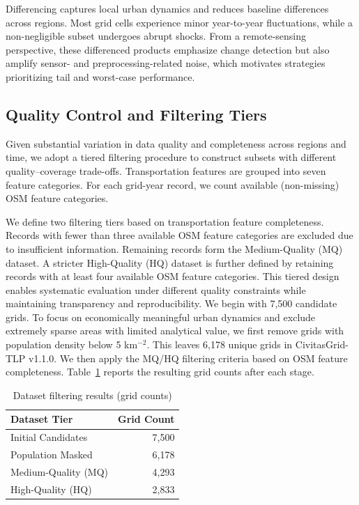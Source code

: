 \documentclass[preprint,12pt]{elsarticle}
\begin{document}
Differencing captures local urban dynamics and reduces baseline differences across regions. Most grid cells experience minor year-to-year fluctuations, while a non-negligible subset undergoes abrupt shocks. From a remote-sensing perspective, these differenced products emphasize change detection but also amplify sensor- and preprocessing-related noise, which motivates strategies prioritizing tail and worst-case performance.

\subsection{Quality Control and Filtering Tiers}

Given substantial variation in data quality and completeness across regions and time, we adopt a tiered filtering procedure to construct subsets with different quality–coverage trade-offs. Transportation features are grouped into seven feature categories. For each grid-year record, we count available (non-missing) OSM feature categories.

We define two filtering tiers based on transportation feature completeness. Records with fewer than three available OSM feature categories are excluded due to insufficient information. Remaining records form the Medium-Quality (MQ) dataset. A stricter High-Quality (HQ) dataset is further defined by retaining records with at least four available OSM feature categories. This tiered design enables systematic evaluation under different quality constraints while maintaining transparency and reproducibility. We begin with 7,500 candidate grids. To focus on economically meaningful urban dynamics and exclude extremely sparse areas with limited analytical value, we first remove grids with population density below 5 km$^{-2}$. This leaves 6,178 unique grids in CivitasGrid-TLP v1.1.0. We then apply the MQ/HQ filtering criteria based on OSM feature completeness. Table~\ref{tab:filtering} reports the resulting grid counts after each stage.
\begin{table}[htbp]
    \centering
    \begin{tabular}{lr}
        \toprule
        \textbf{Dataset Tier} & \textbf{Grid Count}\\
        \midrule
        Initial Candidates & 7,500 \\
        Population Masked & 6,178 \\
        Medium-Quality (MQ) & 4,293 \\
        High-Quality (HQ) & 2,833 \\
        \bottomrule
    \end{tabular}
    \caption{Dataset filtering results (grid counts)}
    \label{tab:filtering}

\end{table}
\end{document}
